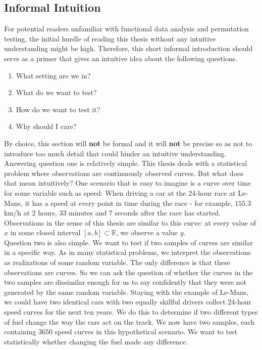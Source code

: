\documentclass[12pt, a4paper]{article}
\theoremstyle{MAstyle} \newtheorem{assumption}{Assumption}[section]
\theoremstyle{MAstyle} \newtheorem{definition}{Definition}[section]
\theoremstyle{MAstyle} \newtheorem{theorem}{Theorem}[section]
\begin{document}
		\subsection{Informal Intuition}\label{Intuition}
			For potential readers unfamiliar with functional data analysis and permutation testing, the initial hurdle of reading this thesis without any intuitive understanding might be high. Therefore, this short informal introduction should serve as a primer that gives an intuitive idea about the following questions.
			\begin{multicols}{2}
				\begin{enumerate}
					\item What setting are we in?
					\item What do we want to test?
					\item How do we want to test it?
					\item Why should I care?
				\end{enumerate}
			\end{multicols}
			By choice, this section will \textbf{not} be formal and it will \textbf{not} be precise so as not to introduce too much detail that could hinder an intuitive understanding.\\
			
			Answering question one is relatively simple. This thesis deals with a statistical problem where observations are continuously observed curves. But what does that mean intuitively? One scenario that is easy to imagine is a curve over time for some variable such as speed: When driving a car at the 24-hour race at Le-Mans, it has a speed at every point in time during the race - for example, $155.3$ km/h at 2 hours, 33 minutes and 7 seconds after the race has started. Observations in the sense of this thesis are similar to this curve: at every value of $x$ in some closed interval $[a,b] \subset \mathbb{R}$, we observe a value $y$.\\
			
			Question two is also simple. We want to test if two samples of curves are similar in a specific way. As in many statistical problems, we interpret the observations as realizations of some random variable. The only difference is that these observations are curves. So we can ask the question of whether the curves in the two samples are dissimilar enough for us to say confidently that they were not generated by the same random variable. 
			Staying with the example of Le-Mans, we could have two identical cars with two equally skillful drivers collect 24-hour speed curves for the next ten years. We do this to determine if two different types of fuel change the way the cars act on the track. We now have two samples, each containing 3650 speed curves in this hypothetical scenario. 
			We want to test statistically whether changing the fuel made any difference.\\
			
\end{document}
